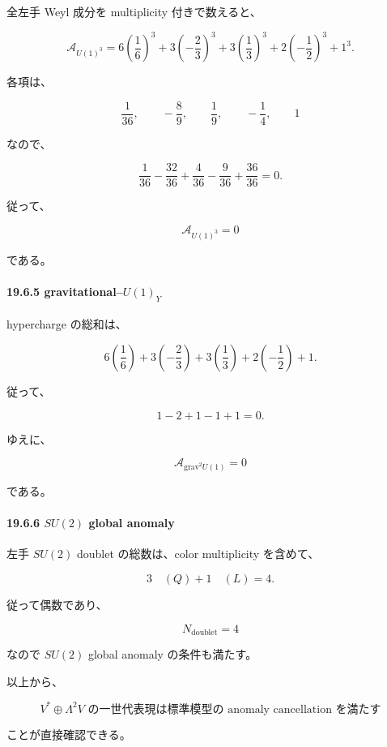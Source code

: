 \documentclass[
  a4paper,
]{ltjsarticle}
\begin{document}
全左手 Weyl 成分を multiplicity 付きで数えると、

\[
\mathcal A_{U(1)^3}
=
6\left(\frac16\right)^3
+
3\left(-\frac23\right)^3
+
3\left(\frac13\right)^3
+
2\left(-\frac12\right)^3
+
1^3.
\tag{128}
\]

各項は、

\[
\frac1{36},
\qquad
-\frac89,
\qquad
\frac19,
\qquad
-\frac14,
\qquad
1
\]

なので、

\[
\frac1{36}
-\frac{32}{36}
+\frac4{36}
-\frac9{36}
+\frac{36}{36}
=
0.
\]

従って、

\[
\boxed{
\mathcal A_{U(1)^3}=0
}
\tag{129}
\]

である。

\paragraph{\texorpdfstring{19.6.5
gravitational--\(U(1)_Y\)}{19.6.5 gravitational--U(1)\_Y}}\label{gravitationalu1_y}

hypercharge の総和は、

\[
6\left(\frac16\right)
+
3\left(-\frac23\right)
+
3\left(\frac13\right)
+
2\left(-\frac12\right)
+
1.
\]

従って、

\[
1-2+1-1+1=0.
\]

ゆえに、

\[
\boxed{
\mathcal A_{\mathrm{grav}^2U(1)}=0
}
\tag{130}
\]

である。

\paragraph{\texorpdfstring{19.6.6 \(SU(2)\) global
anomaly}{19.6.6 SU(2) global anomaly}}\label{su2-global-anomaly}

左手 \(SU(2)\) doublet の総数は、color multiplicity を含めて、

\[
3\quad(Q)
+
1\quad(L)
=
4.
\]

従って偶数であり、

\[
\boxed{
N_{\mathrm{doublet}}=4
}
\tag{131}
\]

なので \(SU(2)\) global anomaly の条件も満たす。

以上から、

\[
\boxed{
V^*\oplus\Lambda^2V
\text{ の一世代表現は標準模型の anomaly cancellation を満たす}
}
\tag{132}
\]

ことが直接確認できる。
\end{document}
